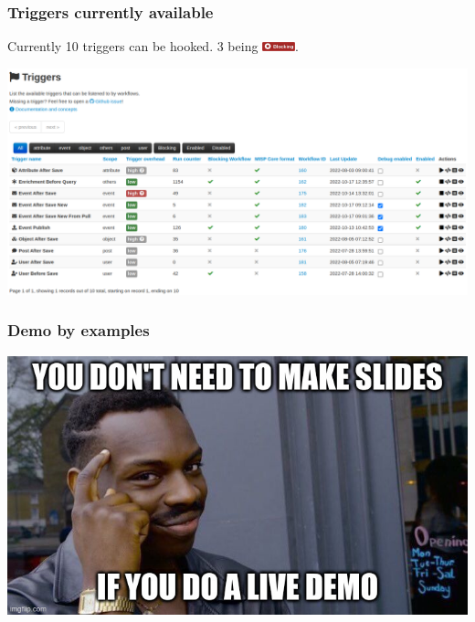 \begin{frame}
    \frametitle{Triggers currently available}
    Currently 10 triggers can be hooked. 3 being \includegraphics[width=36px]{pictures/blocking-workflow.png}.
    \begin{center}
        \includegraphics[width=1.0\linewidth]{pictures/triggers.png}
    \end{center}
\end{frame}

\begin{frame}
    \frametitle{Demo by examples}
    \begin{center}
        \includegraphics[width=0.85\linewidth]{pictures/no-slides-if-demo.jpg}
    \end{center}
\end{frame}

